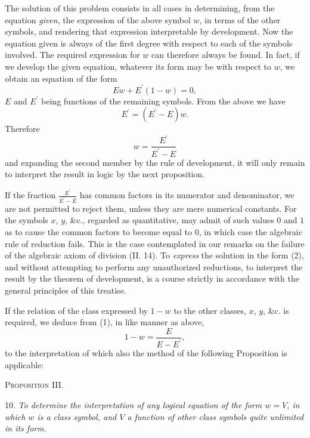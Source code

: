 \documentclass[oneside]{book}
\begin{document}
The solution of this problem consists in all cases in determining,
from the equation \textit{given}, the expression of the above
symbol $w$, in terms of the other symbols, and rendering that expression
interpretable by development. Now the equation given
is always of the first degree with respect to each of the symbols
involved. The required expression for $w$ can therefore always
be found. In fact, if we develop the given equation, whatever
its form may be with respect to $w$, we obtain an equation of the
form
\setcounter{equation}{0}
\begin{equation}
Ew + E^\prime\left(1-w\right) = 0,
\end{equation}
$E$ and $E^\prime$ being functions of the remaining symbols. From the
above we have
\[
E^\prime=\left(E^\prime - E\right)w.
\]
Therefore
\begin{equation}
w = \frac{E^\prime}{E^\prime-E}
\end{equation}
and expanding the second member by the rule of development, it
will only remain to interpret the result in logic by the next
proposition.

If the fraction $\frac{E^\prime}{E^\prime-E}$ has common factors in its numerator
and denominator, we are not permitted to reject them, unless they
are mere numerical constants. For the symbols $x$, $y$, \&c., regarded
as quantitative, may admit of such values $0$ and $1$ as to
cause the common factors to become equal to $0$, in which case
the algebraic rule of reduction fails. This is the case contemplated
in our remarks on the failure of the algebraic axiom of
division (II. 14). To \textit{express} the solution in the form (2), and
without attempting to perform any unauthorized reductions, to
interpret the result by the theorem of development, is a course
strictly in accordance with the general principles of this treatise.

If the relation of the class expressed by $1 - w$ to the other
classes, $x$, $y$, \&c. is required, we deduce from (1), in like manner
as above,
\[
1-w=\frac{E}{E-E^\prime},
\]
to the interpretation of which also the method of the following
Proposition is applicable:

\begin{center}
\textsc{Proposition III.}
\end{center}

10. \textit{To determine the interpretation of any logical equation of
the form $w=V$, in which $w$ is a class symbol, and $V$ a function of
other class symbols quite unlimited in its form.}
\end{document}
